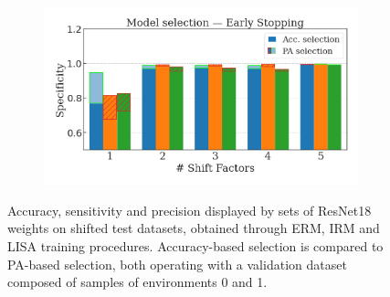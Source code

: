 \begin{figure}[H]
    \begin{subfigure}[b]{0.6\textwidth}
        \centering
        \includegraphics[width=\textwidth]{img/results_discussion/datashift/paper_selection_ppred=1.0_met=specificity.png}
    \end{subfigure}
    \caption{
    Accuracy, sensitivity and precision displayed by sets of ResNet18 weights on
    shifted test datasets, obtained through ERM, IRM and LISA
    training procedures. Accuracy-based selection is compared to PA-based selection, both
    operating with a validation dataset composed of samples of environments 0 and 1.
    }
    \label{fig:datashift_selection}
\end{figure}


\cleardoublepage
